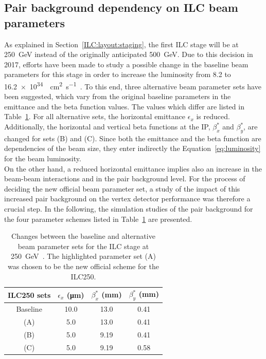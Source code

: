 \subsection{Pair background dependency on ILC beam parameters}
As explained in Section~\ref{ILC:layout:staging}, the first ILC stage will be at \SI{250}{\GeV} instead of the originally anticipated \SI{500}{\GeV}.
Due to this decision in 2017, efforts have been made to study a possible change in the baseline beam parameters for this stage in order to increase the luminosity from \num{8.2} to \SI{16.2e34}{\per\centi\meter\squared\per\second}~\cite{LCWS17_paper}. 
To this end, three alternative beam parameter sets have been suggested, which vary from the original baseline parameters in the emittance and the beta function values.
The values which differ are listed in Table~\ref{tab:ILC250_sets}.
For all alternative sets, the horizontal emittance $\epsilon_x$ is reduced. 
Additionally, the horizontal and vertical beta functions at the IP, $\beta^*_x$ and $\beta^*_y$, are changed for sets (B) and (C).
Since both the emittance and the beta function are dependencies of the beam size, they enter indirectly the Equation~\ref{eq:luminosity} for the beam luminosity.
\\On the other hand, a reduced horizontal emittance implies also an increase in the beam-beam interactions and in the pair background level.
For the process of deciding the new official beam parameter set, a study of the impact of this increased pair background on the \sid vertex detector performance was therefore a crucial step.
In the following, the simulation studies of the pair background for the four parameter schemes listed in Table~\ref{tab:ILC250_sets} are presented.
\begin{table}
\caption[New ILC250 beam parameters]{Changes between the baseline and alternative beam parameter sets for the ILC stage at \SI[detect-all]{250}{\GeV}~\cite{LCWS17_paper}.
The highlighted parameter set (A) was chosen to be the new official scheme for the ILC250.}
\label{tab:ILC250_sets}
\centering
\begin{tabularx}{0.48\textwidth}{c|ccc}
\hline\hline
\textbf{ILC250 sets} & $\epsilon_x$ (\si{\micro\meter}) & $\beta^*_x$ (\si{\milli\meter}) & $\beta^*_y$ (\si{\milli\meter})\\
\hline
 Baseline & 10.0 & 13.0 & 0.41\\
\rowcolor{Gray} (A) & 5.0 & 13.0 & 0.41\\
 (B) & 5.0 & 9.19 & 0.41\\
 (C) & 5.0 & 9.19 & 0.58\\
\hline\hline
\end{tabularx}
\end{table}

